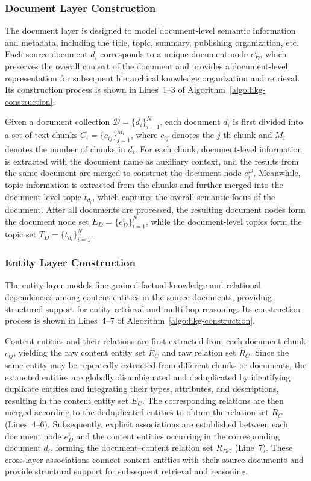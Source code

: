 \documentclass[preprint,12pt,authoryear]{elsarticle}
\begin{document}
\subsubsection{Document Layer Construction}

The document layer is designed to model document-level semantic information and metadata, including the title, topic, summary, publishing organization, etc. Each source document $d_i$ corresponds to a unique document node $e_D^i$, which preserves the overall context of the document and provides a document-level representation for subsequent hierarchical knowledge organization and retrieval. Its construction process is shown in Lines~1--3 of Algorithm~\ref{algo:hkg-construction}.

Given a document collection $\mathcal{D}=\{d_i\}_{i=1}^{N}$, each document $d_i$ is first divided into a set of text chunks $C_i=\{c_{ij}\}_{j=1}^{M_i}$, where $c_{ij}$ denotes the $j$-th chunk and $M_i$ denotes the number of chunks in $d_i$. For each chunk, document-level information is extracted with the document name as auxiliary context, and the results from the same document are merged to construct the document node $e_i^D$. Meanwhile, topic information is extracted from the chunks and further merged into the document-level topic $t_{d_i}$, which captures the overall semantic focus of the document. After all documents are processed, the resulting document nodes form the document node set $E_D=\{e_D^i\}_{i=1}^{N}$, while the document-level topics form the topic set $T_D=\{t_{d_i}\}_{i=1}^{N}$.

\subsubsection{Entity Layer Construction}

The entity layer models fine-grained factual knowledge and relational dependencies among content entities in the source documents, providing structured support for entity retrieval and multi-hop reasoning. Its construction process is shown in Lines~4--7 of Algorithm~\ref{algo:hkg-construction}.

Content entities and their relations are first extracted from each document chunk $c_{ij}$, yielding the raw content entity set $\hat{E}_C$ and raw relation set $\hat{R}_C$. Since the same entity may be repeatedly extracted from different chunks or documents, the extracted entities are globally disambiguated and deduplicated by identifying duplicate entities and integrating their types, attributes, and descriptions, resulting in the content entity set $E_C$. The corresponding relations are then merged according to the deduplicated entities to obtain the relation set $R_C$ (Lines~4--6). Subsequently, explicit associations are established between each document node $e_D^i$ and the content entities occurring in the corresponding document $d_i$, forming the document--content relation set $R_{DC}$ (Line~7). These cross-layer associations connect content entities with their source documents and provide structural support for subsequent retrieval and reasoning.
\end{document}
